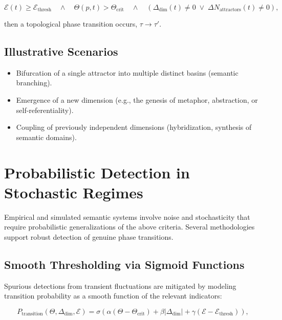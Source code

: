 \begin{equation}
\mathcal{E}(t) \geq \mathcal{E}_{\text{thresh}} \quad \wedge \quad \Theta(p,t) > \Theta_{\text{crit}} \quad \wedge \quad \left(\Delta_{\text{dim}}(t) \neq 0 \;\vee\; \Delta N_{\text{attractors}}(t) \neq 0\right),
\end{equation}

then a topological phase transition occurs, \(\tau \rightarrow \tau'\).

\subsection{Illustrative Scenarios}

\begin{itemize}
    \item Bifurcation of a single attractor into multiple distinct basins (semantic branching).
    \item Emergence of a new dimension (e.g., the genesis of metaphor, abstraction, or self-referentiality).
    \item Coupling of previously independent dimensions (hybridization, synthesis of semantic domains).
\end{itemize}

\section{Probabilistic Detection in Stochastic Regimes}

Empirical and simulated semantic systems involve noise and stochasticity that require probabilistic generalizations of the above criteria. Several methodologies support robust detection of genuine phase transitions.

\subsection{Smooth Thresholding via Sigmoid Functions}

Spurious detections from transient fluctuations are mitigated by modeling transition probability as a smooth function of the relevant indicators:

\begin{equation}
P_{\text{transition}}(\Theta, \Delta_{\text{dim}}, \mathcal{E}) = \sigma\left(\alpha(\Theta - \Theta_{\text{crit}}) + \beta|\Delta_{\text{dim}}| + \gamma(\mathcal{E} - \mathcal{E}_{\text{thresh}})\right),
\end{equation}

